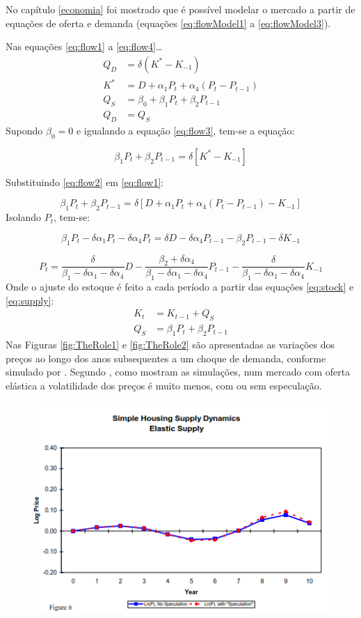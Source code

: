 \documentclass[
	12pt,				%
	oneside,			%
	a4paper,			%
	chapter=TITLE,		%
	section=TITLE,		%
	english,			%
	brazil				%
	]{abntex2}
\begin{document}
\begin{refsection}
No capítulo \ref{economia} foi mostrado que é possível modelar o mercado a
partir de equações de oferta e demanda (equações \eqref{eq:flowModel1} a
\eqref{eq:flowModel3}).

Nas equações \eqref{eq:flow1} a \eqref{eq:flow4}\ldots{}
\begin{align}
Q_D &= \delta (K^* - K_{-1}) \label{eq:flow1}\\
K^* &= D + \alpha_1 P_t + \alpha_4 (P_t - P_{t-1}) \label{eq:flow2} \\
Q_S &= \beta_0 + \beta_1 P_t + \beta_2 P_{t-1} \label{eq:flow3} \\
Q_D &= Q_S \label{eq:flow4}
\end{align}
Supondo \(\beta_0 = 0\) e igualando a equação \eqref{eq:flow3}, tem-se a equação:

\[\beta_1 P_t + \beta_2 P_{t-1} = \delta[K^* - K_{-1}]\]

Substituindo \eqref{eq:flow2} em \eqref{eq:flow1}:

\[\beta_1 P_t + \beta_2 P_{t-1} = \delta[D +\alpha_1 P_t + \alpha_4 (P_t - P_{t-1}) - K_{-1}]\]
Isolando \(P_t\), tem-se:

\[\beta_1 P_t - \delta \alpha_1 P_t -\delta \alpha_4 P_t = \delta D - \delta \alpha_4 P_{t-1} - \beta_2 P_{t-1} - \delta K_{-1}\]

\[P_t = \frac{\delta}{\beta_1 - \delta \alpha_1 - \delta \alpha_4} D - \frac{\beta_2 + \delta \alpha_4}{\beta_1 - \delta \alpha_1 - \delta \alpha_4} P_{t-1} - \frac{\delta}{\beta_1 - \delta \alpha_1 - \delta \alpha_4} K_{-1}\]
Onde o ajuste do estoque é feito a cada período a partir das equações
\eqref{eq:stock} e \eqref{eq:supply}:
\begin{align}
K_t &= K_{t-1} + Q_S \label{eq:stock}\\
Q_S &= \beta_1 P_t + \beta_2 P_{t-1} \label{eq:supply}
\end{align}
Nas Figuras \ref{fig:TheRole1} e \ref{fig:TheRole2} são apresentadas as
variações dos preços ao longo dos anos subsequentes a um choque de demanda,
conforme simulado por \textcite{Malpezzi2002TheRO}. Segundo \textcite[p.~25]{Malpezzi2002TheRO},
como mostram as simulações, num mercado com oferta elástica a volatilidade dos
preços é muito menos, com ou sem especulação.
\begin{figure}[H]

{\centering \includegraphics[width=0.7\linewidth]{images/TheRole_1} 

}
\end{figure}
\end{refsection}
\end{document}
